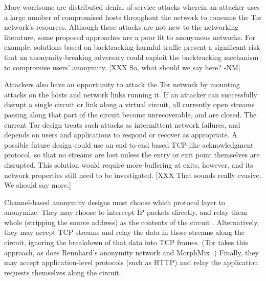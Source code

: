 \documentclass[times,10pt,twocolumn]{article}
\begin{document}

More worrisome are distributed denial of service attacks wherein an
attacker uses a large number of compromised hosts throughout the network
to consume the Tor network's resources.  Although these attacks are not
new to the networking literature, some proposed approaches are a poor
fit to anonymous networks.  For example, solutions based on backtracking
harmful traffic present a significant risk that an anonymity-breaking
adversary could exploit the backtracking mechanism to compromise users'
anonymity.  [XXX So, what should we say here? -NM]


Attackers also have an opportunity to attack the Tor network by mounting
attacks on the hosts and network links running it. If an attacker can
successfully disrupt a single circuit or link along a virtual circuit,
all currently open streams passing along that part of the circuit
become unrecoverable, and are closed.  The current Tor design treats
such attacks as intermittent network failures, and depends on users and
applications to respond or recover as appropriate.  A possible future
design could use an end-to-end based TCP-like acknowledgment protocol,
so that no streams are lost unless the entry or exit point themselves
are disrupted.  This solution would require more buffering at exits,
however, and its network properties still need to be investigated. [XXX
  That sounds really evasive. We should say more.]



Channel-based anonymity designs must choose which protocol layer to
anonymize.  They may choose to intercept IP packets directly, and relay
them whole (stripping the source address) as the contents of the
circuit \cite{tarzan:ccs02,freedom2-arch}.  Alternatively,
they may
accept TCP streams and relay the data in those streams along the
circuit, ignoring the breakdown of that data into TCP frames. (Tor
takes this approach, as does Rennhard's anonymity network \cite{anonnet}
and MorphMix \cite{morphmix:fc04}.)  Finally, they may accept
application-level protocols (such as HTTP) and relay the application
requests themselves along the circuit.
\end{document}
